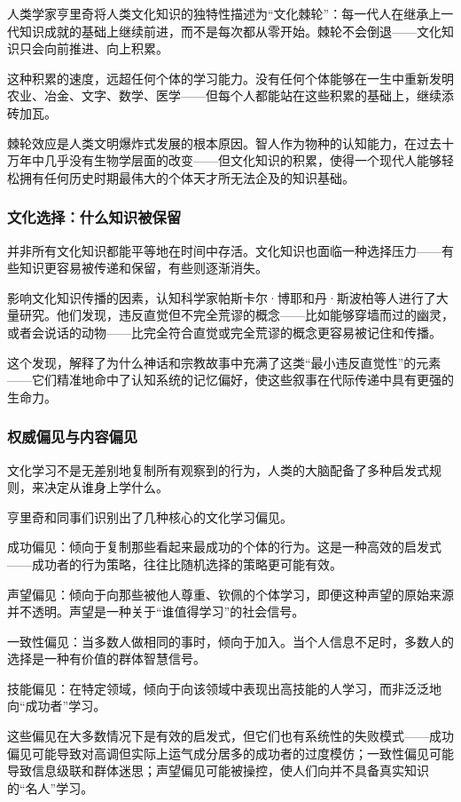 \documentclass[11pt]{article}
\begin{document}
人类学家亨里奇将人类文化知识的独特性描述为“文化棘轮”：每一代人在继承上一代知识成就的基础上继续前进，而不是每次都从零开始。棘轮不会倒退——文化知识只会向前推进、向上积累。

这种积累的速度，远超任何个体的学习能力。没有任何个体能够在一生中重新发明农业、冶金、文字、数学、医学——但每个人都能站在这些积累的基础上，继续添砖加瓦。

棘轮效应是人类文明爆炸式发展的根本原因。智人作为物种的认知能力，在过去十万年中几乎没有生物学层面的改变——但文化知识的积累，使得一个现代人能够轻松拥有任何历史时期最伟大的个体天才所无法企及的知识基础。
\subsubsection{文化选择：什么知识被保留}
\label{sec:org8070567}

并非所有文化知识都能平等地在时间中存活。文化知识也面临一种选择压力——有些知识更容易被传递和保留，有些则逐渐消失。

影响文化知识传播的因素，认知科学家帕斯卡尔·博耶和丹·斯波柏等人进行了大量研究。他们发现，违反直觉但不完全荒谬的概念——比如能够穿墙而过的幽灵，或者会说话的动物——比完全符合直觉或完全荒谬的概念更容易被记住和传播。

这个发现，解释了为什么神话和宗教故事中充满了这类“最小违反直觉性”的元素——它们精准地命中了认知系统的记忆偏好，使这些叙事在代际传递中具有更强的生命力。
\subsubsection{权威偏见与内容偏见}
\label{sec:org6b1b3c8}

文化学习不是无差别地复制所有观察到的行为，人类的大脑配备了多种启发式规则，来决定从谁身上学什么。

亨里奇和同事们识别出了几种核心的文化学习偏见。

成功偏见：倾向于复制那些看起来最成功的个体的行为。这是一种高效的启发式——成功者的行为策略，往往比随机选择的策略更可能有效。

声望偏见：倾向于向那些被他人尊重、钦佩的个体学习，即便这种声望的原始来源并不透明。声望是一种关于“谁值得学习”的社会信号。

一致性偏见：当多数人做相同的事时，倾向于加入。当个人信息不足时，多数人的选择是一种有价值的群体智慧信号。

技能偏见：在特定领域，倾向于向该领域中表现出高技能的人学习，而非泛泛地向“成功者”学习。

这些偏见在大多数情况下是有效的启发式，但它们也有系统性的失败模式——成功偏见可能导致对高调但实际上运气成分居多的成功者的过度模仿；一致性偏见可能导致信息级联和群体迷思；声望偏见可能被操控，使人们向并不具备真实知识的“名人”学习。
\end{document}
